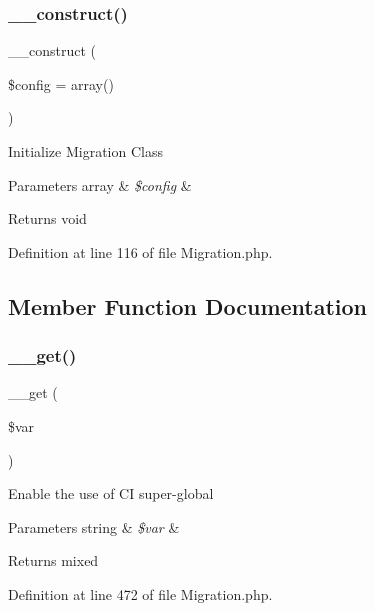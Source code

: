 \subsubsection{\texorpdfstring{\_\_construct()}{\_\_construct()}}
{\footnotesize\ttfamily \+\_\+\+\_\+construct (\begin{DoxyParamCaption}\item[{}]{\$config = {\ttfamily array()} }\end{DoxyParamCaption})}

Initialize Migration Class


\begin{DoxyParams}[1]{Parameters}
array & {\em \$config} & \\
\hline
\end{DoxyParams}
\begin{DoxyReturn}{Returns}
void 
\end{DoxyReturn}


Definition at line 116 of file Migration.\+php.



\subsection{Member Function Documentation}
\mbox{\label{class_c_i___migration_a8fb2d9cdca17b87400e780b9f9720933}} 
\subsubsection{\texorpdfstring{\_\_get()}{\_\_get()}}
{\footnotesize\ttfamily \+\_\+\+\_\+get (\begin{DoxyParamCaption}\item[{}]{\$var }\end{DoxyParamCaption})}

Enable the use of CI super-\/global


\begin{DoxyParams}[1]{Parameters}
string & {\em \$var} & \\
\hline
\end{DoxyParams}
\begin{DoxyReturn}{Returns}
mixed 
\end{DoxyReturn}


Definition at line 472 of file Migration.\+php.

\mbox{\label{class_c_i___migration_a71388693ccdefaea24ca259a0f389806}} 
